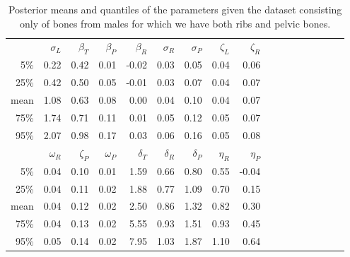\documentclass[12pt]{article}
\begin{document}
\begin{table}[ht]
    \footnotesize
\centering
\begin{tabular}{rrrrrrrrrrrrrrrrr}
  \hline
       &  $\sigma_L$  &  $\beta_T$  &  $\beta_P$  &  $\beta_R$  &  $\sigma_R$  &  $\sigma_P$  &  $\zeta_L$  &  $\zeta_R$  \\
5\%     &  0.22        &  0.42       &  0.01       &  -0.02      &  0.03        &  0.05        &  0.04       &  0.06       \\
25\%    &  0.42        &  0.50       &  0.05       &  -0.01      &  0.03        &  0.07        &  0.04       &  0.07       \\
mean    &  1.08        &  0.63       &  0.08       &  0.00       &  0.04        &  0.10        &  0.04       &  0.07       \\
75\%    &  1.74        &  0.71       &  0.11       &  0.01       &  0.05        &  0.12        &  0.05       &  0.07       \\
95\%    &  2.07        &  0.98       &  0.17       &  0.03       &  0.06        &  0.16        &  0.05       &  0.08       \\
\hline
\hline
        &  $\omega_R$  &  $\zeta_P$  &  $\omega_P$  &  $\delta_T$  &  $\delta_R$  &  $\delta_P$  &  $\eta_R$  &  $\eta_P$  \\
5\%      &  0.04        &  0.10       &  0.01        &  1.59        &  0.66        &  0.80        &  0.55      &  -0.04     \\
25\%     &  0.04        &  0.11       &  0.02        &  1.88        &  0.77        &  1.09        &  0.70      &  0.15      \\
mean     &  0.04        &  0.12       &  0.02        &  2.50        &  0.86        &  1.32        &  0.82      &  0.30      \\
75\%     &  0.04        &  0.13       &  0.02        &  5.55        &  0.93        &  1.51        &  0.93      &  0.45      \\
95\%     &  0.05        &  0.14       &  0.02        &  7.95        &  1.03        &  1.87        &  1.10      &  0.64      \\
   \hline
\end{tabular}
\caption{ \label{tab:complete_males_posterior_distrns} Posterior means and quantiles of the parameters given the dataset consisting only of bones from males for which we have both ribs and pelvic bones.}
\end{table}
\end{document}
